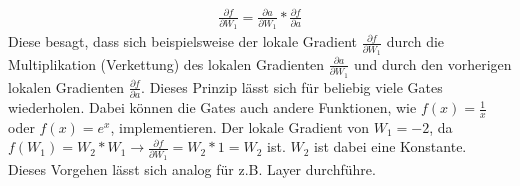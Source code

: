 \begin{align}
	\frac{\partial f}{\partial W_{1}} = \frac{\partial a}{\partial W_{1}} * \frac{\partial f}{\partial a}
\end{align}
Diese besagt, dass sich beispielsweise der lokale Gradient $\frac{\partial f}{\partial W_{1}}$ durch die Multiplikation (Verkettung) des lokalen Gradienten $\frac{\partial a}{\partial W_{1}}$ und durch den vorherigen lokalen Gradienten $\frac{\partial f}{\partial a}$. Dieses Prinzip lässt sich für beliebig viele Gates wiederholen. Dabei können die Gates auch andere Funktionen, wie $f(x) = \frac{1}{x}$ oder $f(x) = e^{x}$, implementieren.
Der lokale Gradient von $W_1 = -2$, da $f(W_1) = W_2 * W_1 \longrightarrow \frac{\partial f}{\partial W_1} = W_2 * 1 = W_2$ ist. $W_2$ ist dabei eine Konstante.\\
Dieses Vorgehen lässt sich analog für z.B. Layer durchführe.


